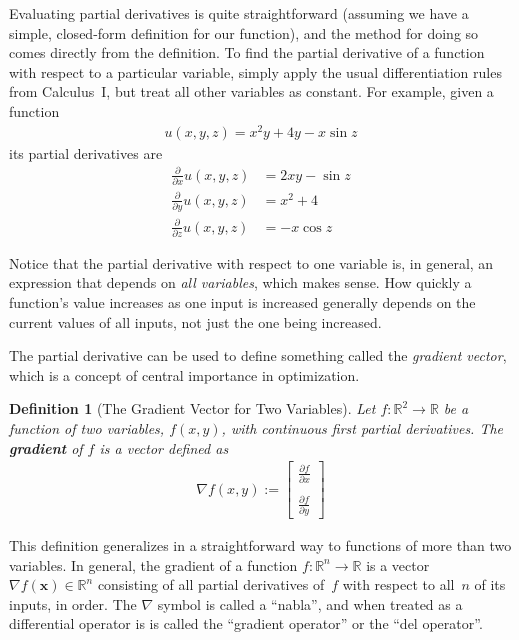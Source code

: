 \documentclass[11pt]{article}
\newtheorem*{definition}{Definition} %
\theoremstyle{definition} %
\begin{document}
Evaluating partial derivatives is quite straightforward (assuming we have a simple, closed-form definition for our function), and the method for doing so comes directly from the definition. To find the partial derivative of a function with respect to a particular variable, simply apply the usual differentiation rules from Calculus~I, but treat all other variables as constant. For example, given a function
\begin{align}
	\label{eqn:exmultivariate} u(x,y,z) = x^2 y + 4y - x \sin z
\end{align}
its partial derivatives are
\begin{align*}
	\frac{\partial}{\partial x} u(x,y,z) &= 2xy - \sin z \\
	\frac{\partial}{\partial y} u(x,y,z) &= x^2 + 4 \\
	\frac{\partial}{\partial z} u(x,y,z) &= -x \cos z
\end{align*}

Notice that the partial derivative with respect to one variable is, in general, an expression that depends on \textit{all variables}, which makes sense. How quickly a function's value increases as one input is increased generally depends on the current values of all inputs, not just the one being increased.

The partial derivative can be used to define something called the \textit{gradient vector}, which is a concept of central importance in optimization.

\begin{definition}[The Gradient Vector for Two Variables]
	Let $f : \mathbb{R}^2 \to \mathbb{R}$ be a function of two variables, $f(x,y)$, with continuous first partial derivatives. The \textbf{gradient} of $f$ is a vector defined as
	\begin{align*}
		\nabla f(x,y) := \begin{bmatrix}
			\displaystyle \frac{\partial f}{\partial x} \\ \\
			\displaystyle \frac{\partial f}{\partial y}
		\end{bmatrix}
	\end{align*}
\end{definition}

This definition generalizes in a straightforward way to functions of more than two variables. In general, the gradient of a function $f : \mathbb{R}^n \to \mathbb{R}$ is a vector $\nabla f(\mathbf{x}) \in \mathbb{R}^n$ consisting of all partial derivatives of~$f$ with respect to all~$n$ of its inputs, in order. The $\nabla$ symbol is called a ``nabla'', and when treated as a differential operator is is called the ``gradient operator'' or the ``del operator''.
\end{document}
